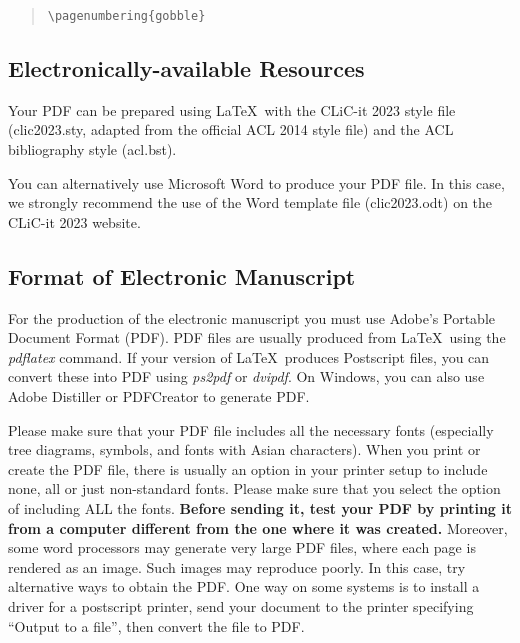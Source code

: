 \documentclass[11pt]{article}
\begin{document}
\begin{quote}
\begin{verbatim}
\pagenumbering{gobble}
\end{verbatim}     
\end{quote}




\subsection{Electronically-available Resources}

Your PDF can be prepared using  \LaTeX\ with
the CLiC-it 2023 style file (clic2023.sty, adapted 
from the  official ACL 2014 style  file) and the 
ACL bibliography style (acl.bst). 

{You can alternatively use Microsoft Word 
to produce your PDF file. In this case, we strongly
recommend the use of the Word template file
(clic2023.odt) on the CLiC-it 2023 website. }



\subsection{Format of Electronic Manuscript}
\label{sect:pdf}

For the production of the electronic manuscript you must use Adobe's
Portable Document Format (PDF). PDF files are usually produced from
\LaTeX\ using the \textit{pdflatex} command. If your version of
\LaTeX\ produces Postscript files, you can convert these into PDF
using \textit{ps2pdf} or \textit{dvipdf}. On Windows, you can also use
Adobe Distiller or PDFCreator to generate PDF.

Please make sure that your PDF file includes all the necessary fonts
(especially tree diagrams, symbols, and fonts with Asian
characters). When you print or create the PDF file, there is usually
an option in your printer setup to include none, all or just
non-standard fonts.  Please make sure that you select the option of
including ALL the fonts. \textbf{Before sending it, test your PDF by
  printing it from a computer different from the one where it was
  created.} Moreover, some word processors may generate very large PDF
files, where each page is rendered as an image. Such images may
reproduce poorly. In this case, try alternative ways to obtain the
PDF. One way on some systems is to install a driver for a postscript
printer, send your document to the printer specifying ``Output to a
file'', then convert the file to PDF.
\end{document}

